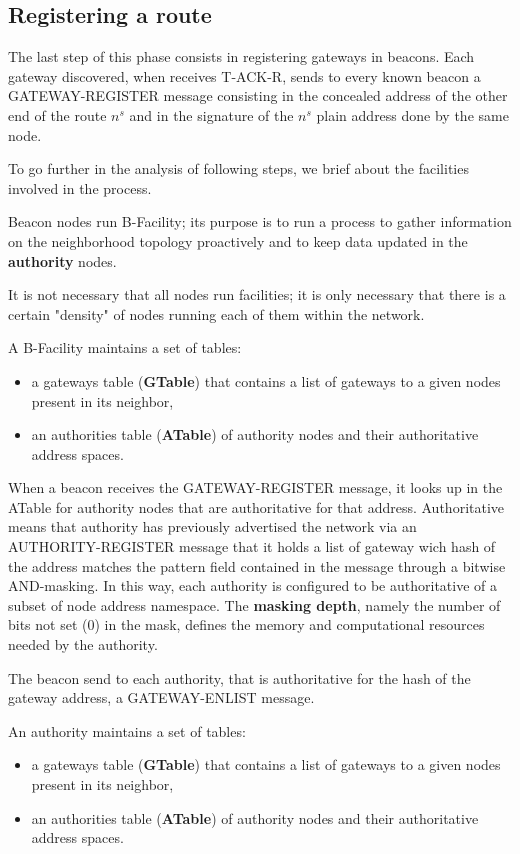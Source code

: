 \documentclass[12pt,oneside]{wlscirep}
\begin{document}
\subsection{Registering a route}
\label{ssec:registering}
The last step of this phase consists in registering gateways in beacons. Each gateway discovered, when receives T-ACK-R, sends to every known beacon a GATEWAY-REGISTER message consisting in the concealed address of the other end of the route $n^s$ and in the signature of the $n^s$ plain address done by the same node. \par
To go further in the analysis of following steps, we brief about  the facilities involved in the process.\par 
Beacon nodes run B-Facility; its purpose is to run a process to gather information on the neighborhood topology proactively and to keep data updated in the \textbf{authority} nodes.\par
It is not necessary that all nodes run facilities; it is only necessary that there is a certain "density" of nodes running each of them within the network.\par
A B-Facility maintains a set of tables:
\begin{itemize}
\item a gateways table (\textbf{GTable}) that contains a list of gateways to a given nodes present in its neighbor,
\item an authorities table (\textbf{ATable}) of authority nodes and their authoritative address spaces. 
\end{itemize}
When a beacon receives the GATEWAY-REGISTER message, it looks up in the ATable for authority nodes that are authoritative for that address. Authoritative means that authority has previously advertised the network via an AUTHORITY-REGISTER message that it holds a list of gateway wich hash of the address matches the pattern field contained in the message through a bitwise AND-masking. In this way, each authority is configured to be authoritative of a subset of node address namespace.  The \textbf{masking depth}, namely the number of bits not set (0) in the mask, defines the memory and computational resources needed by the authority. \par
The beacon send to each authority, that is authoritative for the hash of the gateway address, a GATEWAY-ENLIST message.


An authority maintains a set of tables:
\begin{itemize}
\item a gateways table (\textbf{GTable}) that contains a list of gateways to a given nodes present in its neighbor,
\item an authorities table (\textbf{ATable}) of authority nodes and their authoritative address spaces. 
\end{itemize}
\end{document}

